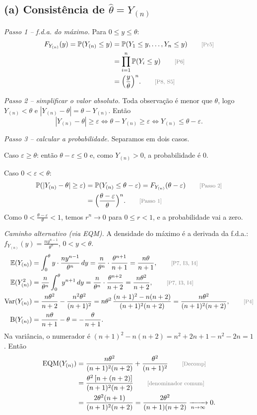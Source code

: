 \documentclass[11pt,a4paper]{article}
\newcommand{\E}{\mathbb{E}}
\newcommand{\Var}{\operatorname{Var}}
\newcommand{\EQM}{\operatorname{EQM}}
\newcommand{\B}{\operatorname{B}}
\newcommand{\Prob}{\mathbb{P}}
\newcommand{\just}[1]{\tag*{\footnotesize\textcolor{gray}{[#1]}}}
\begin{document}
\subsection*{(a) Consistência de $\hat\theta=Y_{(n)}$}

\textit{Passo 1 -- f.d.a. do máximo.} Para $0\le y\le\theta$:
\begin{align*}
F_{Y_{(n)}}(y)=\Prob(Y_{(n)}\le y)&=\Prob(Y_1\le y,\dots,Y_n\le y) \just{Pr5}\\
&=\prod_{i=1}^n\Prob(Y_i\le y) \just{P6}\\
&=\Big(\frac y\theta\Big)^n . \just{P8, S5}
\end{align*}

\textit{Passo 2 -- simplificar o valor absoluto.} Toda observação é menor que $\theta$, logo $Y_{(n)}<\theta$ e $|Y_{(n)}-\theta|=\theta-Y_{(n)}$. Então
\[
|Y_{(n)}-\theta|\ge\varepsilon\iff\theta-Y_{(n)}\ge\varepsilon\iff Y_{(n)}\le\theta-\varepsilon .
\]

\textit{Passo 3 -- calcular a probabilidade.} Separamos em dois casos.

Caso $\varepsilon\ge\theta$: então $\theta-\varepsilon\le0$ e, como $Y_{(n)}>0$, a probabilidade é $0$.

Caso $0<\varepsilon<\theta$:
\begin{align*}
\Prob(|Y_{(n)}-\theta|\ge\varepsilon)&=\Prob(Y_{(n)}\le\theta-\varepsilon)=F_{Y_{(n)}}(\theta-\varepsilon) \just{Passo 2}\\
&=\Big(\frac{\theta-\varepsilon}{\theta}\Big)^n . \just{Passo 1}
\end{align*}
Como $0<\frac{\theta-\varepsilon}{\theta}<1$, temos $r^n\to0$ para $0\le r<1$, e a probabilidade vai a zero.

\textit{Caminho alternativo (via EQM).} A densidade do máximo é a derivada da f.d.a.: $f_{Y_{(n)}}(y)=\frac{ny^{n-1}}{\theta^n}$, $0<y<\theta$.
\begin{align*}
\E(Y_{(n)})&=\int_0^\theta y\cdot\frac{ny^{n-1}}{\theta^n}\,dy=\frac{n}{\theta^n}\cdot\frac{\theta^{n+1}}{n+1}=\frac{n\theta}{n+1}, \just{P7, I3, I4}\\
\E(Y_{(n)}^2)&=\frac{n}{\theta^n}\int_0^\theta y^{n+1}\,dy=\frac{n}{\theta^n}\cdot\frac{\theta^{n+2}}{n+2}=\frac{n\theta^2}{n+2}, \just{P7, I3, I4}\\
\Var(Y_{(n)})&=\frac{n\theta^2}{n+2}-\frac{n^2\theta^2}{(n+1)^2}
=n\theta^2\,\frac{(n+1)^2-n(n+2)}{(n+1)^2(n+2)}
=\frac{n\theta^2}{(n+1)^2(n+2)}, \just{P4}\\
\B(Y_{(n)})&=\frac{n\theta}{n+1}-\theta=-\frac{\theta}{n+1}.
\end{align*}
Na variância, o numerador é $(n+1)^2-n(n+2)=n^2+2n+1-n^2-2n=1$. Então
\begin{align*}
\EQM(Y_{(n)})&=\frac{n\theta^2}{(n+1)^2(n+2)}+\frac{\theta^2}{(n+1)^2} \just{Decomp}\\
&=\frac{\theta^2\,[n+(n+2)]}{(n+1)^2(n+2)} \just{denominador comum}\\
&=\frac{2\theta^2(n+1)}{(n+1)^2(n+2)}=\frac{2\theta^2}{(n+1)(n+2)}\xrightarrow[n\to\infty]{}0 .
\end{align*}
\end{document}

